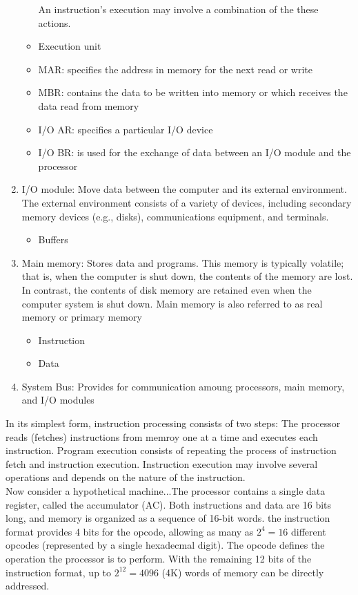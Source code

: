 \documentclass{article}
\begin{document}
\begin{enumerate}[label = \arabic*]
\begin{itemize}
		An instruction's execution may involve a combination of the these actions.
		
	\item Execution unit
	\item MAR: specifies the address in memory for the next read or write
	\item MBR: contains the data to be written into memory or which receives the data read from memory
	\item I/O AR: specifies a particular I/O device
	\item I/O BR: is used for the exchange of data between an I/O module and the processor
	\end{itemize}
\item I/O module: Move data between the computer and its external environment. The external environment consists of a variety of devices, including secondary memory devices (e.g., disks), communications equipment, and terminals.
	\begin{itemize}
	\item Buffers
	\end{itemize}
\item Main memory: Stores data and programs. This memory is typically volatile; that is, when the computer is shut down, the contents of the memory are lost. In contrast, the contents of disk memory are retained even when the computer system is shut down. Main memory is also referred to as real memory or primary memory
	\begin{itemize}
	\item Instruction
	\item Data
	\end{itemize}
\item System Bus: Provides for communication amoung processors, main memory, and I/O modules
\end{enumerate}

In its simplest form, instruction processing consists of two steps: The processor reads (fetches) instructions from memroy one at a time and executes each instruction. Program execution consists of repeating the process of instruction fetch and instruction execution. Instruction execution may involve several operations and depends on the nature of the instruction.\\

Now consider a hypothetical machine...The processor contains a single data register, called the accumulator (AC). Both instructions and data are 16 bits long, and memory is organized as a sequence of 16-bit words. the instruction format provides 4 bits for the opcode, allowing as many as $2^4 = 16$ different opcodes (represented by a single hexadecmal digit). The opcode defines the operation the processor is to perform. With the remaining 12 bits of the instruction format, up to $2^12 = 4096$ (4K) words of memory can be directly addressed.
\end{document}
